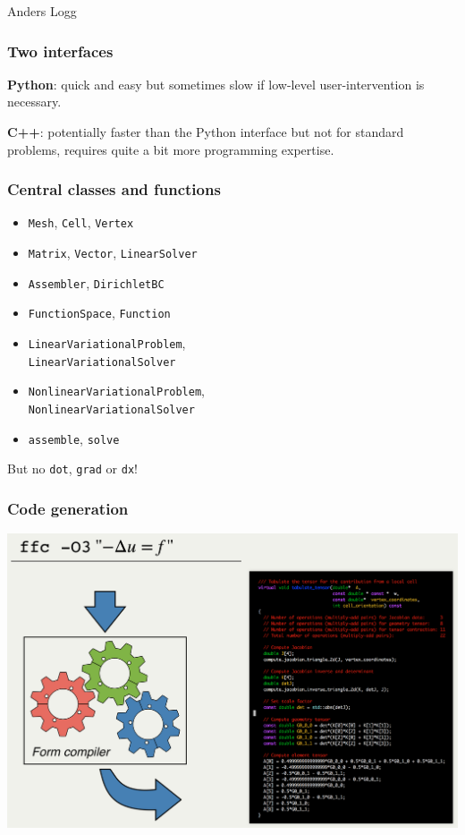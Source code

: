 \documentclass{fenicscourse}
\begin{document}
              {Anders Logg}

\begin{frame}
  \frametitle{Two interfaces}

  \textbf{Python}: quick and easy but sometimes slow if
  low-level user-intervention is necessary.

  \bigskip

  \textbf{C++}: potentially faster than the Python interface
  but not for standard problems, requires quite a bit more programming
  expertise.

\end{frame}

\begin{frame}
  \frametitle{Central classes and functions}

  \begin{itemize}
  \item
    \texttt{Mesh}, \texttt{Cell}, \texttt{Vertex}
  \item
    \texttt{Matrix}, \texttt{Vector}, \texttt{LinearSolver}
  \item
    \texttt{Assembler}, \texttt{DirichletBC}
  \item
    \texttt{FunctionSpace}, \texttt{Function}
  \item
    \texttt{LinearVariationalProblem}, \\
    \texttt{LinearVariationalSolver}
  \item
    \texttt{NonlinearVariationalProblem}, \\
    \texttt{NonlinearVariationalSolver}
  \item
    \texttt{assemble}, \texttt{solve}
  \end{itemize}

  \bigskip

  But no \texttt{dot}, \texttt{grad} or \texttt{dx}!

\end{frame}

\begin{frame}
  \frametitle{Code generation}

\begin{center}
\includegraphics[width=\textwidth]{png/codegeneration_new.png}
\end{center}

\end{frame}
\end{document}
